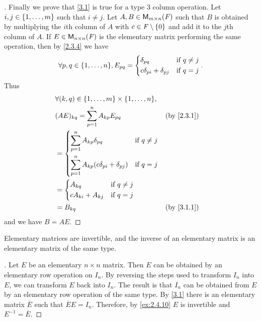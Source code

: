 \begin{proof}[]
	Finally we prove that \cref{3.1} is true for a type 3 column operation.
	Let \(i, j \in \left\lbrace1, \dots, m\right\rbrace\) such that \(i \neq j\).
	Let \(A, B \in \mathsf{M}_{{m} \times n}({\mathit{F}})\) such that \(B\) is obtained by multiplying the \(i\)th column of \(A\) with \(c \in \mathit{F} \setminus \left\lbrace0\right\rbrace\) and add it to the \(j\)th column of \(A\).
	If \(E \in \mathsf{M}_{{n} \times n}({\mathit{F}})\) is the elementary matrix performing the same operation, then by \cref{2.3.4} we have
	\[
		\forall p, q \in \set{1, \dots, n}, E_{p q} = \begin{dcases}
			\delta_{p q}                  & \text{if } q \neq j \\
			c \delta_{p i} + \delta_{p j} & \text{if } q = j
		\end{dcases}.
	\]
	Thus
	\begin{align*}
		 & \forall (k, q) \in \set{1, \dots, m} \times \set{1, \dots, n},                                  \\
		 & (AE)_{k q} = \sum_{p = 1}^n A_{k p} E_{p q}                                     &  & \by{2.3.1} \\
		 & = \begin{dcases}
			     \sum_{p = 1}^n A_{k p} \delta_{p q}                    & \text{if } q \neq j \\
			     \sum_{p = 1}^n A_{k p} (c \delta_{p i} + \delta_{p j}) & \text{if } q = j
		     \end{dcases}                  \\
		 & = \begin{dcases}
			     A_{k q}             & \text{if } q \neq j \\
			     c A_{k i} + A_{k j} & \text{if } q = j
		     \end{dcases}                                                     \\
		 & = B_{k q}                                                                       &  & \by{3.1.1}
	\end{align*}
	and we have \(B = AE\).
\end{proof}

\begin{thm}\label{3.2}
	Elementary matrices are invertible, and the inverse of an elementary matrix is an elementary matrix of the same type.
\end{thm}

\begin{proof}[]
	Let \(E\) be an elementary \(n \times n\) matrix.
	Then \(E\) can be obtained by an elementary row operation on \(I_n\).
	By reversing the steps used to transform \(I_n\) into \(E\), we can transform \(E\) back into \(I_n\).
	The result is that \(I_n\) can be obtained from \(E\) by an elementary row operation of the same type.
	By \cref{3.1} there is an elementary matrix \(\overline{E}\) such that \(\overline{E} E = I_n\).
	Therefore, by \cref{ex:2.4.10} \(E\) is invertible and \(E^{-1} = \overline{E}\).
\end{proof}

